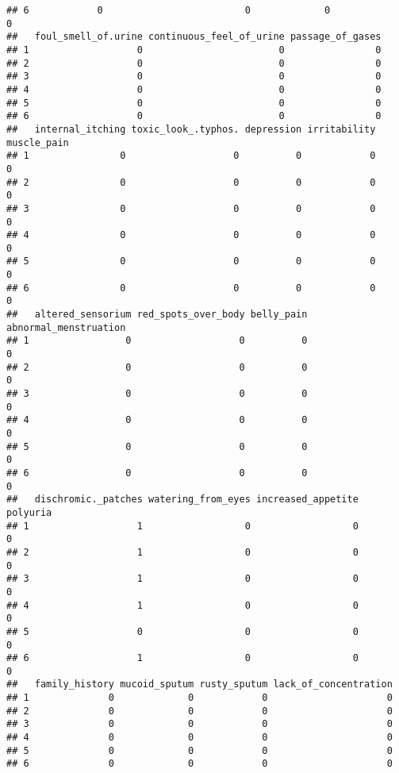 \documentclass[
]{article}
\begin{document}
\begin{verbatim}
## 6            0                         0             0                  0
##   foul_smell_of.urine continuous_feel_of_urine passage_of_gases
## 1                   0                        0                0
## 2                   0                        0                0
## 3                   0                        0                0
## 4                   0                        0                0
## 5                   0                        0                0
## 6                   0                        0                0
##   internal_itching toxic_look_.typhos. depression irritability muscle_pain
## 1                0                   0          0            0           0
## 2                0                   0          0            0           0
## 3                0                   0          0            0           0
## 4                0                   0          0            0           0
## 5                0                   0          0            0           0
## 6                0                   0          0            0           0
##   altered_sensorium red_spots_over_body belly_pain abnormal_menstruation
## 1                 0                   0          0                     0
## 2                 0                   0          0                     0
## 3                 0                   0          0                     0
## 4                 0                   0          0                     0
## 5                 0                   0          0                     0
## 6                 0                   0          0                     0
##   dischromic._patches watering_from_eyes increased_appetite polyuria
## 1                   1                  0                  0        0
## 2                   1                  0                  0        0
## 3                   1                  0                  0        0
## 4                   1                  0                  0        0
## 5                   0                  0                  0        0
## 6                   1                  0                  0        0
##   family_history mucoid_sputum rusty_sputum lack_of_concentration
## 1              0             0            0                     0
## 2              0             0            0                     0
## 3              0             0            0                     0
## 4              0             0            0                     0
## 5              0             0            0                     0
## 6              0             0            0                     0

\end{verbatim}
\end{document}
